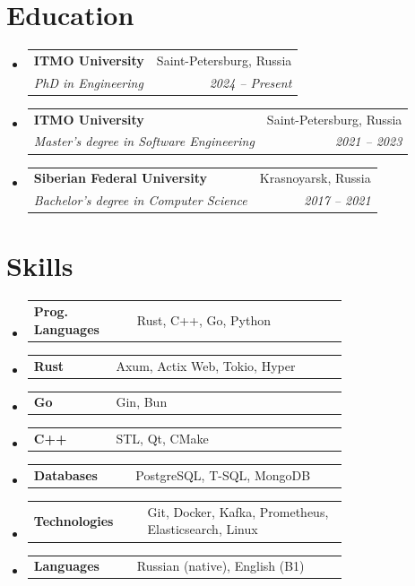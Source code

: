\documentclass[a4paper,11pt]{article}
\makeatletter
\newcommand{\resumeItem}[1]{
  \item\small{#1}
}
\newcommand{\resumeItemListStart}{\begin{itemize}[rightmargin=0.11in]}
\newcommand{\resumeItemListEnd}{\end{itemize}}
\newcommand{\resumeSectionType}[3]{
  \item\begin{tabular*}{0.96\textwidth}[t]{
    p{0.16\linewidth}p{0.02\linewidth}p{0.55\linewidth}
  }
    \textbf{#1} & #2 & #3
  \end{tabular*}\vspace{-2pt}
}
\newcommand{\resumeTrioHeading}[3]{
  \item\small{
    \begin{tabular*}{0.96\textwidth}[t]{
      l@{\extracolsep{\fill}}c@{\extracolsep{\fill}}r
    }
      \textbf{#1} & \textit{#2} & #3
    \end{tabular*}
  }
}
\newcommand{\resumeQuadHeading}[4]{
  \item
  \begin{tabular*}{0.96\textwidth}[t]{l@{\extracolsep{\fill}}r}
    \textbf{#1} & #2 \\
    \textit{\small#3} & \textit{\small #4} \\
  \end{tabular*}
}
\newcommand{\resumeHeadingListStart}{
  \begin{itemize}[leftmargin=0.15in, label={}]
}
\newcommand{\resumeHeadingListEnd}{\end{itemize}}
\makeatother
\begin{document}

\section{Education}
  \resumeHeadingListStart{}
    \resumeQuadHeading{ITMO University}{Saint-Petersburg, Russia}
    {PhD in Engineering}{2024 -- Present}
    
    \resumeQuadHeading{ITMO University}{Saint-Petersburg, Russia}
    {Master's degree in Software Engineering}{2021 -- 2023}

    \resumeQuadHeading{Siberian Federal University}{Krasnoyarsk, Russia}
    {Bachelor's degree in Computer Science}{2017 -- 2021}
  \resumeHeadingListEnd{}



\section{Skills}
  \resumeHeadingListStart{}
    \resumeSectionType{Prog. Languages}{}{Rust, C++, Go, Python}
    \resumeSectionType{Rust}{}{Axum, Actix Web, Tokio, Hyper}
    \resumeSectionType{Go}{}{Gin, Bun}
    \resumeSectionType{C++}{}{STL, Qt, CMake}
    \resumeSectionType{Databases}{}{PostgreSQL, T-SQL, MongoDB}
    \resumeSectionType{Technologies}{}{Git, Docker, Kafka, Prometheus, Elasticsearch, Linux}
    \resumeSectionType{Languages}{}{Russian (native), English (B1)}
  \resumeHeadingListEnd{}



\end{document}
